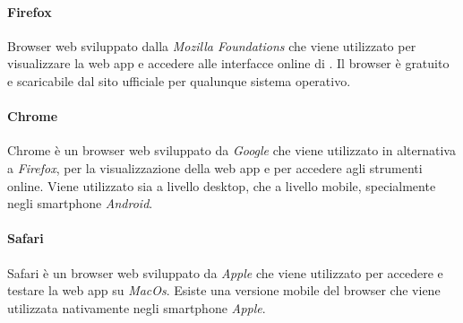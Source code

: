 				\paragraph{Firefox}
					Browser web sviluppato dalla \textit{Mozilla Foundations} che viene utilizzato per visualizzare la web app e accedere alle interfacce online di .
					\newline
					Il browser è gratuito e scaricabile dal sito ufficiale per qualunque sistema operativo.

				\paragraph{Chrome}
					Chrome è un browser web sviluppato da \textit{Google} che viene utilizzato in alternativa a \textit{Firefox}, per la visualizzazione della web app e per accedere agli strumenti online.
					\newline
					Viene utilizzato sia a livello desktop, che a livello mobile, specialmente negli smartphone \textit{Android}.

				\paragraph{Safari}
					Safari è un browser web sviluppato da \textit{Apple} che viene utilizzato per accedere e testare la web app su \textit{MacOs}.
					\newline
					Esiste una versione mobile del browser che viene utilizzata nativamente negli smartphone \textit{Apple}.
